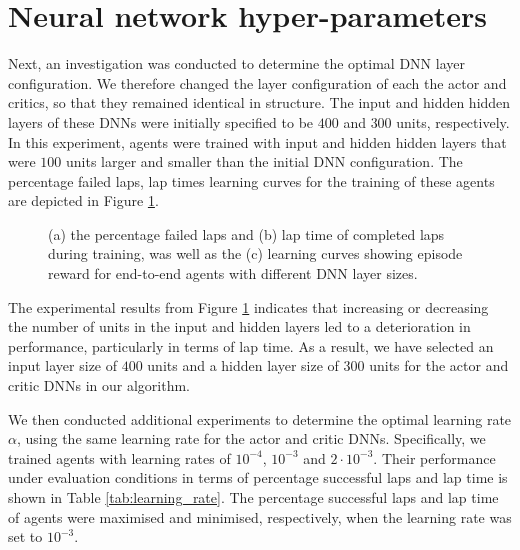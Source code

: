 
\section{Neural network hyper-parameters}

Next, an investigation was conducted to determine the optimal DNN layer configuration.
We therefore changed the layer configuration of each the actor and critics, so that they remained identical in structure.
The input and hidden hidden layers of these DNNs were initially specified to be $400$ and $300$ units, respectively.
In this experiment, agents were trained with input and hidden hidden layers that were $100$ units larger and smaller than the initial DNN configuration.
The percentage failed laps, lap times learning curves for the training of these agents are depicted in Figure \ref{fig:layer_sizes}.

\begin{figure}[htb!]
    \centering
    
    \caption[Learning curves for tuning the target update rate]{(a) the percentage failed laps and (b) lap time of completed laps during training, was well as the (c) learning curves showing episode reward for end-to-end agents with different DNN layer sizes.}
    \label{fig:layer_sizes}
\end{figure}


The experimental results from Figure \ref{fig:layer_sizes} indicates that increasing or decreasing the number of units in the input and hidden layers led to a deterioration in performance, particularly in terms of lap time.
As a result, we have selected an input layer size of $400$ units and a hidden layer size of $300$ units for the actor and critic DNNs in our algorithm.


We then conducted additional experiments to determine the optimal learning rate $\alpha$, using the same learning rate for the actor and critic DNNs.
Specifically, we trained agents with learning rates of $10^{-4}$, $10^{-3}$ and $2\cdot10^{-3}$.
Their performance under evaluation conditions in terms of percentage successful laps and lap time is shown in Table \ref{tab:learning_rate}.
The percentage successful laps and lap time of agents were maximised and minimised, respectively, when the learning rate was set to $10^{-3}$.


